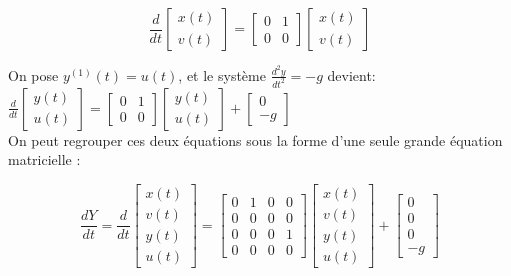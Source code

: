 \documentclass[10pt]{article}
\begin{document}
\[
\frac{d}{d t}\left[\begin{array}{l}
x(t) \\
v(t)
\end{array}\right]=\left[\begin{array}{ll}
0 & 1 \\
0 & 0
\end{array}\right]\left[\begin{array}{l}
x(t) \\
v(t)
\end{array}\right]
\]

On pose \(y^{(1)}(t)=u(t)\), et le système \(\frac{d^{2} y}{d t^{2}}=-g\) devient:\\
\(\frac{d}{d t}\left[\begin{array}{l}y(t) \\ u(t)\end{array}\right]=\left[\begin{array}{ll}0 & 1 \\ 0 & 0\end{array}\right]\left[\begin{array}{l}y(t) \\ u(t)\end{array}\right]+\left[\begin{array}{c}0 \\ -g\end{array}\right]\)\\
On peut regrouper ces deux équations sous la forme d'une seule grande équation matricielle :

\[
\frac{d Y}{d t}=\frac{d}{d t}\left[\begin{array}{c}
x(t) \\
v(t) \\
y(t) \\
u(t)
\end{array}\right]=\left[\begin{array}{llll}
0 & 1 & 0 & 0 \\
0 & 0 & 0 & 0 \\
0 & 0 & 0 & 1 \\
0 & 0 & 0 & 0
\end{array}\right]\left[\begin{array}{c}
x(t) \\
v(t) \\
y(t) \\
u(t)
\end{array}\right]+\left[\begin{array}{c}
0 \\
0 \\
0 \\
-g
\end{array}\right]
\]
\end{document}
